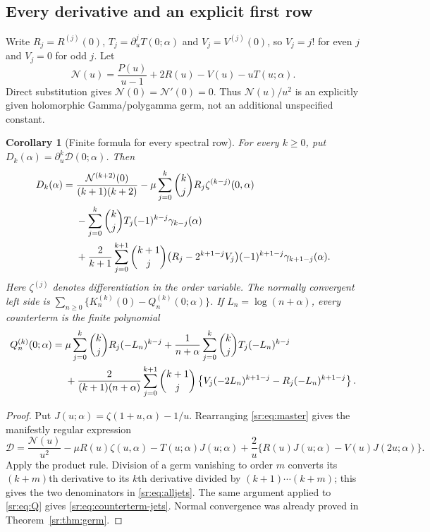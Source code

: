 \documentclass[11pt,letterpaper]{article}
\newtheorem{corollary}[theorem]{Corollary}
\theoremstyle{definition}
\theoremstyle{remark}
\numberwithin{equation}{section}
\begin{document}
\subsection{Every derivative and an explicit first row}
Write $R_j=R^{(j)}(0)$, $T_j=\partial_u^jT(0;\alpha)$ and
$V_j=V^{(j)}(0)$, so $V_j=j!$ for even $j$ and $V_j=0$ for odd $j$.
Let
\begin{equation}\label{sr:eq:N-germ}
 \mathcal N(u)=\frac{P(u)}{u-1}+2R(u)-V(u)-uT(u;\alpha).
\end{equation}
Direct substitution gives $\mathcal N(0)=\mathcal N'(0)=0$.
Thus $\mathcal N(u)/u^2$ is an explicitly given holomorphic
Gamma/polygamma germ, not an additional unspecified constant.

\begin{corollary}[Finite formula for every spectral row]
\label{sr:cor:alljets}
For every $k\ge0$, put $D_k(\alpha)=\partial_u^k\mathcal D(0;\alpha)$.
Then
\begin{align}
 D_k(\alpha)={}&
 \frac{\mathcal N^{(k+2)}(0)}{(k+1)(k+2)}
 -\mu\sum_{j=0}^k\binom kj R_j\zeta^{(k-j)}(0,\alpha)\notag\\
 &-\sum_{j=0}^k\binom kj T_j(-1)^{k-j}\gamma_{k-j}(\alpha)\notag\\
 &+\frac2{k+1}\sum_{j=0}^{k+1}\binom{k+1}j
 \bigl(R_j-2^{k+1-j}V_j\bigr)(-1)^{k+1-j}
 \gamma_{k+1-j}(\alpha).
 \label{sr:eq:alljets}
\end{align}
Here $\zeta^{(j)}$ denotes differentiation in the order variable.
The normally convergent left side is
$\sum_{n\ge0}\{K_n^{(k)}(0)-Q_n^{(k)}(0;\alpha)\}$. If
$L_n=\log(n+\alpha)$, every counterterm is the finite polynomial
\begin{align}
 Q_n^{(k)}(0;\alpha)={}&\mu\sum_{j=0}^k\binom kjR_j(-L_n)^{k-j}
 +\frac1{n+\alpha}\sum_{j=0}^k\binom kjT_j(-L_n)^{k-j}\notag\\
 &+\frac2{(k+1)(n+\alpha)}
 \sum_{j=0}^{k+1}\binom{k+1}j
 \left\{V_j(-2L_n)^{k+1-j}-R_j(-L_n)^{k+1-j}\right\}.
 \label{sr:eq:counterterm-jets}
\end{align}
\end{corollary}
\begin{proof}
Put $J(u;\alpha)=\zeta(1+u,\alpha)-1/u$. Rearranging
\eqref{sr:eq:master} gives the manifestly regular expression
\[
 \mathcal D=\frac{\mathcal N(u)}{u^2}-\mu R(u)\zeta(u,\alpha)
 -T(u;\alpha)J(u;\alpha)
 +\frac2u\{R(u)J(u;\alpha)-V(u)J(2u;\alpha)\}.
\]
Apply the product rule. Division of a germ vanishing to order $m$
converts its $(k+m)$th derivative to its $k$th derivative divided by
$(k+1)\cdots(k+m)$; this gives the two denominators in
\eqref{sr:eq:alljets}. The same argument applied to \eqref{sr:eq:Q}
gives \eqref{sr:eq:counterterm-jets}. Normal convergence was already
proved in Theorem~\ref{sr:thm:germ}.
\end{proof}
\end{document}
